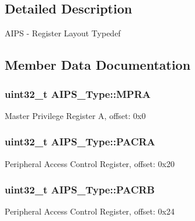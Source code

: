 \subsection{Detailed Description}
A\+I\+PS -\/ Register Layout Typedef 

\subsection{Member Data Documentation}
\subsubsection[{\texorpdfstring{M\+P\+RA}{MPRA}}]{ uint32\+\_\+t A\+I\+P\+S\+\_\+\+Type\+::\+M\+P\+RA}\hypertarget{structAIPS__Type_ae9d17ee3a5debdbbdd6f8e6f90eb6466}{}\label{structAIPS__Type_ae9d17ee3a5debdbbdd6f8e6f90eb6466}
Master Privilege Register A, offset\+: 0x0 
\subsubsection[{\texorpdfstring{P\+A\+C\+RA}{PACRA}}]{ uint32\+\_\+t A\+I\+P\+S\+\_\+\+Type\+::\+P\+A\+C\+RA}\hypertarget{structAIPS__Type_a2c39e8dbbb58b9ad0caa11934c0c9fa2}{}\label{structAIPS__Type_a2c39e8dbbb58b9ad0caa11934c0c9fa2}
Peripheral Access Control Register, offset\+: 0x20 
\subsubsection[{\texorpdfstring{P\+A\+C\+RB}{PACRB}}]{ uint32\+\_\+t A\+I\+P\+S\+\_\+\+Type\+::\+P\+A\+C\+RB}\hypertarget{structAIPS__Type_a09845073faa73e743dcb3a4f47a51b19}{}\label{structAIPS__Type_a09845073faa73e743dcb3a4f47a51b19}
Peripheral Access Control Register, offset\+: 0x24 

